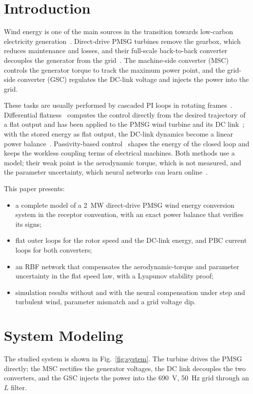 \documentclass[conference]{IEEEtran}
\begin{document}
\section{Introduction}
Wind energy is one of the main sources in the transition towards low-carbon electricity
generation~\cite{iea2024,gwec2024}. Direct-drive PMSG turbines remove the gearbox, which reduces
maintenance and losses, and their full-scale back-to-back converter decouples the generator from the
grid~\cite{polinder2013,wu2011}. The machine-side converter (MSC) controls the generator torque to track
the maximum power point, and the grid-side converter (GSC) regulates the DC-link voltage and injects the
power into the grid.

These tasks are usually performed by cascaded PI loops in rotating frames~\cite{chinchilla2006,yazdani2010}.
Differential flatness~\cite{fliess1995} computes the control directly from the desired trajectory of a
flat output and has been applied to the PMSG wind turbine and its DC link~\cite{aimene2022}; with the
stored energy as flat output, the DC-link dynamics become a linear power balance~\cite{thounthong2010}.
Passivity-based control~\cite{ortega1998} shapes the energy of the closed loop and keeps the workless
coupling terms of electrical machines. Both methods use a model; their weak point is the aerodynamic
torque, which is not measured, and the parameter uncertainty, which neural networks can learn
online~\cite{lewis1999}.

This paper presents:
\begin{itemize}
\item a complete model of a 2~MW direct-drive PMSG wind energy conversion system in the receptor
convention, with an exact power balance that verifies its signs;
\item flat outer loops for the rotor speed and the DC-link energy, and PBC current loops for both
converters;
\item an RBF network that compensates the aerodynamic-torque and parameter uncertainty in the flat speed
law, with a Lyapunov stability proof;
\item simulation results without and with the neural compensation under step and turbulent wind,
parameter mismatch and a grid voltage dip.
\end{itemize}

\section{System Modeling}
The studied system is shown in Fig.~\ref{fig:system}. The turbine drives the PMSG directly; the MSC
rectifies the generator voltages, the DC link decouples the two converters, and the GSC injects the
power into the 690~V, 50~Hz grid through an $L$ filter.
\end{document}
